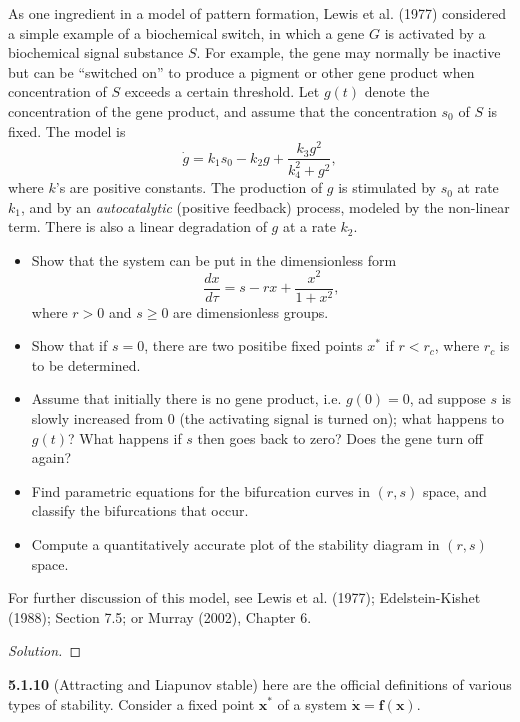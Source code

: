 \documentclass[10pt]{amsart}
\newenvironment{solution}
{\begin{proof}[Solution]}
{\end{proof}}
\begin{document}
\begin{onehalfspace}
        As one ingredient in a model of pattern formation, Lewis et al. (1977) considered a simple example of a
        biochemical switch, in which a gene $G$ is activated by a biochemical signal substance $S$.
        For example, the gene may normally be inactive but can be ``switched on'' to produce a pigment or other gene
        product when concentration of $S$ exceeds a certain threshold.
        Let $g(t)$ denote the concentration of the gene product, and assume that the concentration $s_0$ of $S$ is
        fixed.
        The model is
        \[
            \dot{g} = k_1 s_0 - k_2 g + \frac{k_3 g^2}{k_4^2 + g^2},
        \]
        where $k$'s are positive constants.
        The production of $g$ is stimulated by $s_0$ at rate $k_1$, and by an \emph{autocatalytic} (positive feedback)
        process, modeled by the non-linear term.
        There is also a linear degradation of $g$ at a rate $k_2$.
        \begin{itemize}
            \item[a)] Show that the system can be put in the dimensionless form
            \[
                \frac{dx}{d\tau} = s - rx + \frac{x^2}{1+x^2},
            \]
            where $r > 0$ and $s\ge 0$ are dimensionless groups.
            \item[b)] Show that if $s = 0$, there are two positibe fixed points $x^*$ if $r < r_c$, where $r_c$ is to
            be determined.
            \item[c)] Assume that initially there is no gene product, i.e. $g(0) = 0$, ad suppose $s$ is slowly
            increased from $0$ (the activating signal is turned on); what happens to $g(t)$?
            What happens if $s$ then goes back to zero?
            Does the gene turn off again?
            \item[d)] Find parametric equations for the bifurcation curves in $(r, s)$ space, and classify
            the bifurcations that occur.
            \item[e)] Compute a quantitatively accurate plot of the stability diagram in $(r, s)$ space.
        \end{itemize}
        For further discussion of this model, see Lewis et al. (1977); Edelstein-Kishet (1988); Section 7.5; or
        Murray (2002), Chapter 6.

        \begin{solution}
        \end{solution}

        \noindent\textbf{5.1.10} (Attracting and Liapunov stable) here are the official definitions of various
        types of stability.
        Consider a fixed point $\mathbf{x^*}$ of a system $\mathbf{\dot{x} = f(x)}$.


\end{onehalfspace}
\end{document}
